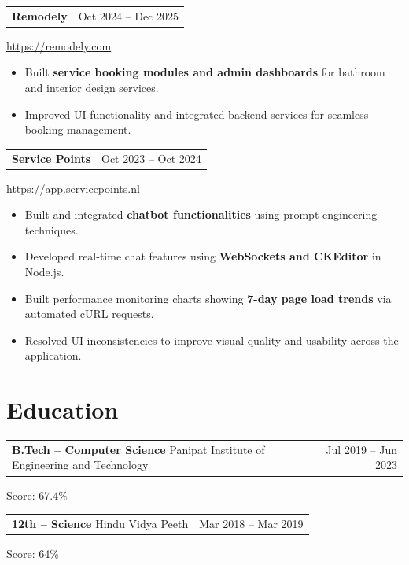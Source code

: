 \documentclass[10.5pt, a4paper]{article}
\makeatletter
\newcommand{\projentry}[3]{%
  \vspace{0.5pt}%
  \begin{tabularx}{\linewidth}{@{} X r @{}}
    {\fontsize{10pt}{12pt}\selectfont\bfseries\color{cvdark} #1}
    &
    {\fontsize{8.5pt}{10pt}\selectfont\color{cvgray} #2}
  \end{tabularx}%
  \par\vspace{0.5pt}%
  {\fontsize{8.5pt}{10pt}\selectfont\color{cvsteel}\href{#3}{#3}}%
  \vspace{1pt}%
}
\newcommand{\eduentry}[4]{%
  \vspace{0.5pt}%
  \begin{tabularx}{\linewidth}{@{} X r @{}}
    {\fontsize{10pt}{12pt}\selectfont\bfseries\color{cvdark} #1}
    \enspace{\textcolor[RGB]{195,210,228}{$|$}}\enspace
    {\fontsize{9pt}{11pt}\selectfont\color{cvgray} #2}
    &
    {\fontsize{8.5pt}{10pt}\selectfont\color{cvgray} #3}
  \end{tabularx}%
  \par\vspace{0.5pt}%
  {\fontsize{9pt}{11pt}\selectfont\color{cvgray} #4}%
  \vspace{1pt}%
}
\makeatother
\begin{document}
\vspace{1pt}

\projentry{Remodely}{Oct 2024 -- Dec 2025}{https://remodely.com}
{\fontsize{9pt}{11.5pt}\selectfont
\begin{itemize}
  \item Built \textbf{service booking modules and admin dashboards} for bathroom and interior design services.
  \item Improved UI functionality and integrated backend services for seamless booking management.
\end{itemize}
}

\vspace{1pt}

\projentry{Service Points}{Oct 2023 -- Oct 2024}{https://app.servicepoints.nl}
{\fontsize{9pt}{11.5pt}\selectfont
\begin{itemize}
  \item Built and integrated \textbf{chatbot functionalities} using prompt engineering techniques.
  \item Developed real-time chat features using \textbf{WebSockets and CKEditor} in Node.js.
  \item Built performance monitoring charts showing \textbf{7-day page load trends} via automated cURL requests.
  \item Resolved UI inconsistencies to improve visual quality and usability across the application.
\end{itemize}
}

\section{Education}

\eduentry{B.Tech -- Computer Science}{Panipat Institute of Engineering and Technology}{Jul 2019 -- Jun 2023}{Score: 67.4\%}

\vspace{1pt}

\eduentry{12th -- Science}{Hindu Vidya Peeth}{Mar 2018 -- Mar 2019}{Score: 64\%}
\end{document}
